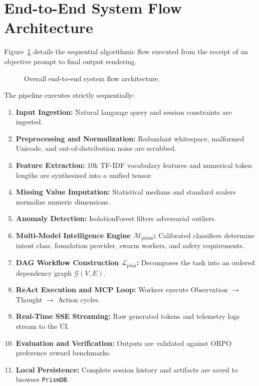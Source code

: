 \documentclass[12pt,a4paper]{report}
\begin{document}
\section{End-to-End System Flow Architecture}
Figure~\ref{fig:system_flow} details the sequential algorithmic flow executed from the receipt of an objective prompt to final output rendering.

\begin{figure}[H]
    \centering
    \caption{Overall end-to-end system flow architecture.}
    \label{fig:system_flow}
\end{figure}

The pipeline executes strictly sequentially:
\begin{enumerate}
    \item \textbf{Input Ingestion:} Natural language query and session constraints are ingested.
    \item \textbf{Preprocessing and Normalization:} Redundant whitespace, malformed Unicode, and out-of-distribution noise are scrubbed.
    \item \textbf{Feature Extraction:} 10k TF-IDF vocabulary features and numerical token lengths are synthesized into a unified tensor.
    \item \textbf{Missing Value Imputation:} Statistical medians and standard scalers normalize numeric dimensions.
    \item \textbf{Anomaly Detection:} IsolationForest filters adversarial outliers.
    \item \textbf{Multi-Model Intelligence Engine $\mathcal{M}_{\text{prism}}$:} Calibrated classifiers determine intent class, foundation provider, swarm workers, and safety requirements.
    \item \textbf{DAG Workflow Construction $\mathcal{L}_{\text{plan}}$:} Decomposes the task into an ordered dependency graph $\mathcal{G}(V, E)$.
    \item \textbf{ReAct Execution and MCP Loop:} Workers execute Observation $\to$ Thought $\to$ Action cycles.
    \item \textbf{Real-Time SSE Streaming:} Raw generated tokens and telemetry logs stream to the UI.
    \item \textbf{Evaluation and Verification:} Outputs are validated against ORPO preference reward benchmarks.
    \item \textbf{Local Persistence:} Complete session history and artifacts are saved to browser \texttt{PrismDB}.
\end{enumerate}
\end{document}
